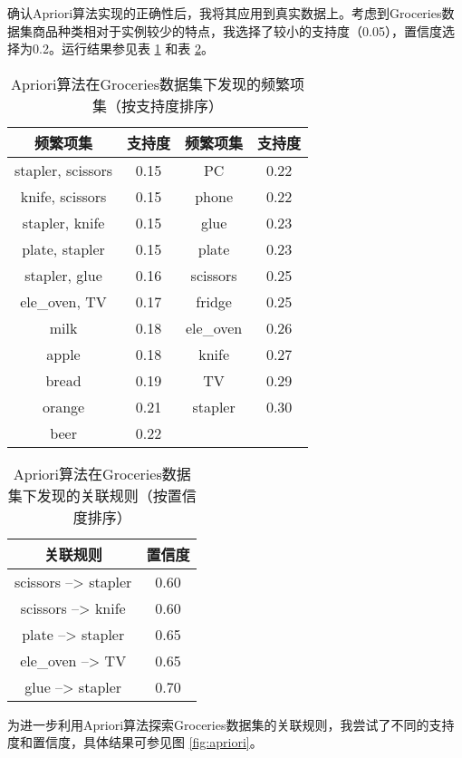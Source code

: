 \documentclass[12pt,a4paper]{article}
\theoremstyle{definition}
\begin{document}
确认Apriori算法实现的正确性后，我将其应用到真实数据上。考虑到Groceries数据集商品种类相对于实例较少的特点，我选择了较小的支持度（0.05），置信度选择为0.2。运行结果参见表 \ref{tab:apriori_gro_sup} 和表 \ref{tab:apriori_gro_con}。

\begin{table}[H]
	\renewcommand\arraystretch{1.35}
	\caption{Apriori算法在Groceries数据集下发现的频繁项集（按支持度排序）}
	\label{tab:apriori_gro_sup}
	\centering
	
	\begin{tabular}{c|c|c|c}
		\centering
		频繁项集 & 支持度 & 频繁项集 & 支持度 \\
		\hline
		stapler, scissors & 0.15 & PC & 0.22 \\
		knife, scissors & 0.15 & phone & 0.22 \\
		stapler, knife & 0.15 & glue & 0.23 \\
		plate, stapler & 0.15 &plate & 0.23 \\
		stapler, glue & 0.16 & scissors & 0.25 \\
		ele\_oven, TV & 0.17 & fridge & 0.25 \\
		milk & 0.18 & ele\_oven & 0.26 \\
		apple & 0.18 & knife & 0.27 \\
		bread & 0.19 & TV & 0.29 \\
		orange & 0.21 & stapler & 0.30 \\
		beer & 0.22 & & \\		
	\end{tabular}
\end{table}

\begin{table}[H]
	\renewcommand\arraystretch{1.35}
	\caption{Apriori算法在Groceries数据集下发现的关联规则（按置信度排序）}
	\label{tab:apriori_gro_con}
	\centering
	
	\begin{tabular}{c|c}
		\centering
		关联规则 & 置信度 \\
		\hline
		scissors --> stapler & 0.60 \\
		scissors --> knife & 0.60 \\
		plate --> stapler & 0.65 \\
		ele\_oven --> TV & 0.65 \\
		glue --> stapler & 0.70 \\
	\end{tabular}
\end{table}

为进一步利用Apriori算法探索Groceries数据集的关联规则，我尝试了不同的支持度和置信度，具体结果可参见图 \ref{fig:apriori}。
\end{document}
